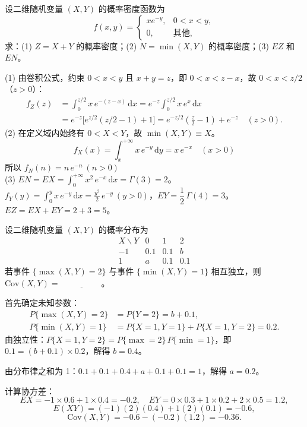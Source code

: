 \documentclass[lang=cn,11pt]{elegantbook}
\begin{document}
\begin{exercise}\label{exer:4-joint-xey}
设二维随机变量 \((X,Y)\) 的概率密度函数为
\[
f(x,y) = \begin{cases} xe^{-y}, & 0 < x < y, \\ 0, & \text{其他}, \end{cases}
\]
求：(1) \(Z = X + Y\) 的概率密度；(2) \(N = \min(X,Y)\) 的概率密度；(3) \(EZ\) 和 \(EN\)。
\end{exercise}
\begin{solution}
(1) 由卷积公式，约束 \(0 < x < y\) 且 \(x + y = z\)，即 \(0 < x < z - x\)，故 \(0 < x < z/2\)（\(z > 0\)）：
\begin{align*}
f_Z(z) &= \int_0^{z/2} x\,e^{-(z-x)}\,\mathrm{d}x= e^{-z}\!\int_0^{z/2} x\,e^x\,\mathrm{d}x\\
&= e^{-z}\bigl[e^{z/2}(z/2 - 1) + 1\bigr]= e^{-z/2}\!\left(\frac{z}{2}-1\right) + e^{-z}\quad(z>0).
\end{align*}
(2) 在定义域内始终有 \(0 < X < Y\)，故 \(\min(X,Y) \equiv X\)。
\[f_X(x) = \displaystyle\int_x^{+\infty} x\,e^{-y}\,\mathrm{d}y = x\,e^{-x}\quad(x > 0)\]
所以 \(f_N(n) = n\,e^{-n}\ (n > 0)\)\\
(3) \(EN = EX = \displaystyle\int_0^{+\infty} x^2\,e^{-x}\,\mathrm{d}x = \Gamma(3) = 2\)。\\
\(f_Y(y) = \displaystyle\int_0^y x\,e^{-y}\,\mathrm{d}x = \frac{y^2}{2}\,e^{-y}\ (y > 0)\)，\(EY = \dfrac{1}{2}\,\Gamma(4) = 3\)。\\
\(EZ = EX + EY = 2 + 3 = 5\)。
\end{solution}


\begin{exercise}\label{exer:4-s3-maxmin}
设二维随机变量 \((X,Y)\) 的概率分布为
\[
\begin{array}{c|ccc}
X \backslash Y & 0 & 1 & 2 \\
\hline
-1 & 0.1 & 0.1 & b \\
1 & a & 0.1 & 0.1
\end{array}
\]
若事件 \(\{\max(X,Y)=2\}\) 与事件 \(\{\min(X,Y)=1\}\) 相互独立，则 \(\mathrm{Cov}(X,Y) =\,\underline{\hspace{2cm}}\)。
\end{exercise}

\begin{solution}
首先确定未知参数：
\begin{align*}
P\{\max(X,Y)=2\} &= P\{Y=2\} = b + 0.1,\\
P\{\min(X,Y)=1\} &= P\{X=1,Y=1\} + P\{X=1,Y=2\} = 0.2.
\end{align*}
由独立性：\(P\{X=1,Y=2\} = P\{\max=2\}\,P\{\min=1\}\)，即 \(0.1 = (b+0.1) \times 0.2\)，解得 \(b = 0.4\)。

由分布律之和为 1：\(0.1+0.1+0.4+a+0.1+0.1 = 1\)，解得 \(a = 0.2\)。

计算协方差：
\[
EX = -1 \times 0.6 + 1 \times 0.4 = -0.2,\quad EY = 0 \times 0.3 + 1 \times 0.2 + 2 \times 0.5 = 1.2,
\]
\[
E(XY) = (-1)(2)(0.4) + 1(2)(0.1) = -0.6,
\]
\[
\mathrm{Cov}(X,Y) = -0.6 - (-0.2)(1.2) = -0.36.
\]
\end{solution}
\end{document}
